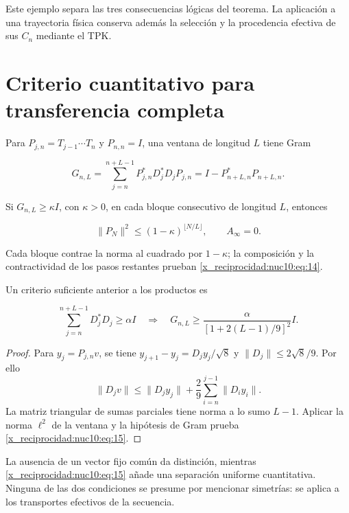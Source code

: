 Este ejemplo separa las tres consecuencias lógicas del teorema. La
aplicación a una trayectoria física conserva además la selección y la
procedencia efectiva de sus \(C_n\) mediante el TPK.

\section{Criterio cuantitativo para transferencia completa}

Para \(P_{j,n}=T_{j-1}\cdots T_n\) y \(P_{n,n}=I\), una ventana de longitud \(L\) tiene Gram



\[
G_{n,L}=\sum_{j=n}^{n+L-1}P_{j,n}^*D_j^*D_jP_{j,n}
=I-P_{n+L,n}^*P_{n+L,n}.
\]



Si \(G_{n,L}\geq\kappa I\), con \(\kappa>0\), en cada bloque consecutivo de longitud \(L\), entonces



\begin{equation}
\|P_N\|^2\le(1-\kappa)^{\lfloor N/L\rfloor},\qquad A_\infty=0.
\label{x_reciprocidad:nuc10:eq:14}
\end{equation}



Cada bloque contrae la norma al cuadrado por \(1-\kappa\); la composición y la contractividad de los pasos restantes prueban \eqref{x_reciprocidad:nuc10:eq:14}.

Un criterio suficiente anterior a los productos es



\begin{equation}
\sum_{j=n}^{n+L-1}D_j^*D_j\ge\alpha I
\quad\Longrightarrow\quad
G_{n,L}\ge\frac{\alpha}{[1+2(L-1)/9]^2}I.
\label{x_reciprocidad:nuc10:eq:15}
\end{equation}



\begin{proof}
Para \(y_j=P_{j,n}v\), se tiene
\(y_{j+1}-y_j=D_jy_j/\sqrt8\) y \(\|D_j\|\leq2\sqrt8/9\). Por ello
\[
\|D_jv\|\leq\|D_jy_j\|+\frac29\sum_{i=n}^{j-1}\|D_iy_i\|.
\]
La matriz triangular de sumas parciales tiene norma a lo sumo \(L-1\).
Aplicar la norma \(\ell^2\) de la ventana y la hipótesis de Gram prueba \eqref{x_reciprocidad:nuc10:eq:15}.

\end{proof}

La ausencia de un vector fijo común da distinción, mientras \eqref{x_reciprocidad:nuc10:eq:15} añade una separación uniforme cuantitativa. Ninguna de las dos condiciones se presume por mencionar simetrías: se aplica a los transportes efectivos de la secuencia.

